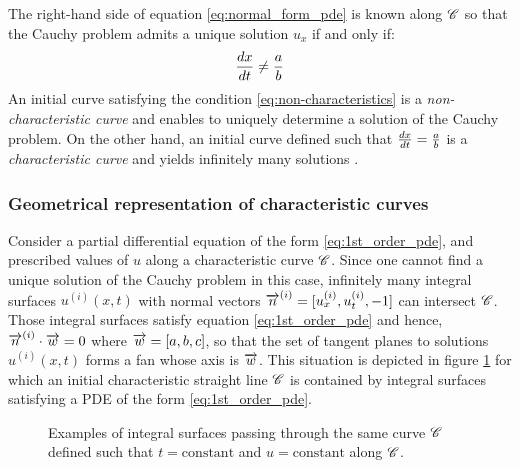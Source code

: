 The right-hand side of equation \eqref{eq:normal_form_pde} is known along $\mathscr{C}$ so that the Cauchy problem admits a unique solution $u_x$ if and only if:
\begin{equation}
  \label{eq:non-characteristics}
  \frac{d x}{d t}\neq \frac{a}{b}
\end{equation}
An initial curve satisfying the condition \eqref{eq:non-characteristics} is a \textit{non-characteristic curve} and enables to uniquely determine a solution of the Cauchy problem. On the other hand, an initial curve defined such that $\frac{d x}{d t} = \frac{a}{b}$ is a \textit{characteristic curve} and yields infinitely many solutions \cite[p.65]{Courant}. 



\subsubsection*{Geometrical representation of characteristic curves}
Consider a partial differential equation of the form \eqref{eq:1st_order_pde}, and prescribed values of $u$ along a characteristic curve $\mathscr{C}$. Since one cannot find a unique solution of the Cauchy problem in this case, infinitely many integral surfaces $u^{(i)}(x,t)$ with normal vectors ${\overrightarrow{n}}^{(i)}=[u^{(i)}_x,u^{(i)}_t,-1]$ can intersect $\mathscr{C}$. Those integral surfaces satisfy equation \eqref{eq:1st_order_pde} and hence, ${\overrightarrow{n}}^{(i)}\cdot {\overrightarrow{w}}=0$ where ${\overrightarrow{w}}=[a,b,c]$, so that the set of tangent planes to solutions $u^{(i)}(x,t)$ forms a fan whose axis is ${\overrightarrow{w}}$.
This situation is depicted in figure \ref{fig:plan_fan} for which an initial characteristic straight line $\mathscr{C}$ is contained by integral surfaces satisfying a PDE of the form \eqref{eq:1st_order_pde}.
\begin{figure}[h!]
  \centering
  
  \caption{Examples of integral surfaces passing through the same curve $\mathscr{C}$ defined such that $t=\mathrm{constant}$ and $u=\mathrm{constant}$ along $\mathscr{C}$.}
  \label{fig:plan_fan}
\end{figure}

